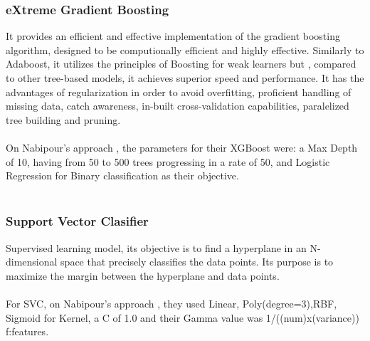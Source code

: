 \documentclass[conference]{IEEEtran}
\begin{document}
\subsubsection{eXtreme Gradient Boosting}
It provides an efficient and effective implementation of the gradient boosting algorithm, designed to be computionally efficient
and highly effective. Similarly to Adaboost, it utilizes the principles of Boosting for weak learners but , compared to other tree-based models, it achieves superior speed and performance. It has the advantages of regularization in order to avoid
overfitting, proficient handling of missing data, catch awareness, in-built cross-validation capabilities, paralelized tree building and pruning.
\\\\
On Nabipour's approach \cite{nabipour2020predicting}, the parameters for their XGBoost were: a Max Depth of 10, having from 50 to 500 trees progressing in a rate of 50, and Logistic Regression for Binary classification as their objective.
\\\\
\subsubsection{Support Vector Clasifier}
Supervised learning model, its objective is to find a hyperplane in an N-dimensional space that
precisely classifies the data points. Its purpose is to maximize the margin between the hyperplane and data points.
\\\\
For SVC, on Nabipour's approach \cite{nabipour2020predicting}, they used Linear, Poly(degree=3),RBF, Sigmoid for Kernel, a C of 1.0 and their Gamma value was 1/((num)x(variance)) f:features.
\\\\
\end{document}
